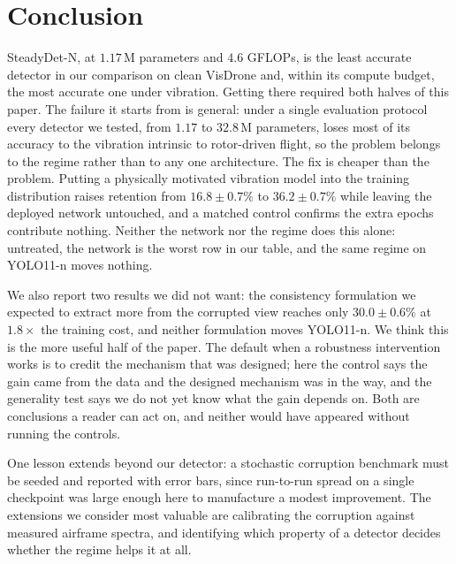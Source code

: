 \section{Conclusion}

SteadyDet-N, at $1.17$\,M parameters and $4.6$ GFLOPs, is the least accurate
detector in our comparison on clean VisDrone and, within its compute budget, the
most accurate one under vibration. Getting there required both halves of this paper. The failure it
starts from is general: under a single evaluation protocol every detector we
tested, from $1.17$ to $32.8$\,M parameters, loses most of its accuracy to the
vibration intrinsic to rotor-driven flight, so the problem belongs to the regime
rather than to any one architecture. The fix is cheaper than the problem. Putting a
physically motivated vibration model into the training distribution raises
retention from $16.8 \pm 0.7\%$ to $36.2 \pm 0.7\%$ while leaving the deployed
network untouched, and a matched control confirms the extra epochs contribute
nothing. Neither the network nor the regime does this alone: untreated, the network
is the worst row in our table, and the same regime on YOLO11-n moves nothing.

We also report two results we did not want: the consistency formulation we expected
to extract more from the corrupted view reaches only $30.0 \pm 0.6\%$ at
$1.8\times$ the training cost, and neither formulation moves YOLO11-n. We think this
is the more useful half of the paper. The default when a robustness
intervention works is to credit the mechanism that was designed; here the control
says the gain came from the data and the designed mechanism was in the way, and the
generality test says we do not yet know what the gain depends on. Both are
conclusions a reader can act on, and neither would have appeared without running
the controls.

One lesson extends beyond our detector: a stochastic corruption benchmark must be
seeded and reported with error bars, since run-to-run spread on a single checkpoint
was large enough here to manufacture a modest improvement. The extensions we
consider most valuable are calibrating the corruption against measured airframe
spectra, and identifying which property of a detector decides whether the regime
helps it at all.
